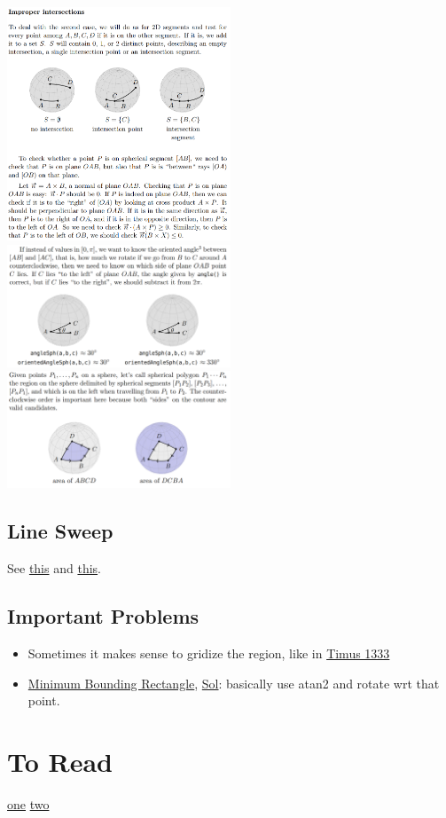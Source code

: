 \documentclass[8pt, a4paper, oneside, twocolumn]{extarticle}
\begin{document}
\\\includegraphics[width=0.5\textwidth,height=0.5\textheight,keepaspectratio]{assets/segsegcir3}
\\\includegraphics[width=0.5\textwidth,height=0.5\textheight,keepaspectratio]{assets/orientedangle}
\\\includegraphics[width=0.5\textwidth,height=0.5\textheight,keepaspectratio]{assets/spherearea}
\subsection{Line Sweep}
See \href{https://www.topcoder.com/community/competitive-programming/tutorials/line-sweep-algorithms/}{this} and \href{https://github.com/sourabhxyz/Competitive-Programming/blob/master/RevisionNotes/linesweep.pdf}{this}.
\subsection{Important Problems}
\begin{itemize}
    \item Sometimes it makes sense to gridize the region, like in \href{https://github.com/sourabhxyz/Competitive-Programming/blob/master/timus/1333.cpp}{Timus 1333}
    \item \href{https://uva.onlinejudge.org/external/101/10173.pdf}{Minimum Bounding Rectangle}, \href{https://github.com/sourabhxyz/Competitive-Programming/blob/master/UVA_10173.cpp}{Sol}: basically use atan2 and rotate wrt that point.
\end{itemize}
\section{To Read}
\href{https://codeforces.com/blog/entry/64829}{one}
\href{https://codeforces.com/blog/entry/64783}{two}
\end{document}
